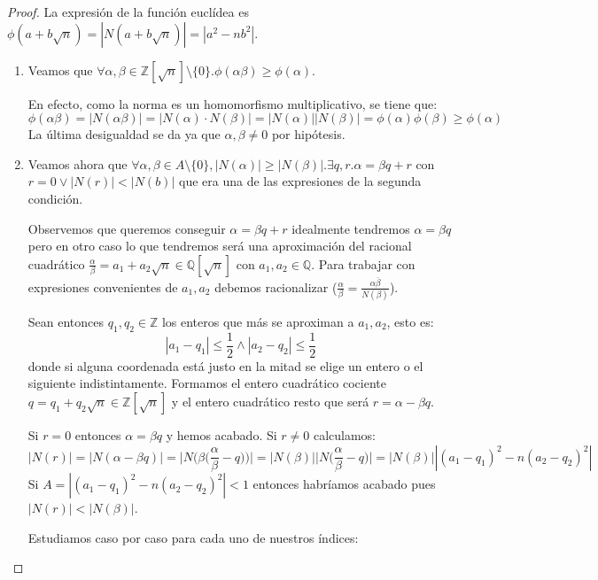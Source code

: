\begin{proof}
	La expresión de la función euclídea es $\phi(a+b\sqrt{n}) = |N(a+b\sqrt{n})| = |a^2 - nb^2|$.
	
	\begin{enumerate}
	\item Veamos que $\forall \alpha,\beta \in \mathbb{Z}[\sqrt{n}] \setminus \{0\}.\phi(\alpha \beta) \ge \phi(\alpha)$. 
	
	En efecto, como la norma es un homomorfismo multiplicativo, se tiene que: $$\phi(\alpha \beta) = |N(\alpha \beta)| = |N(\alpha) \cdot N(\beta)| = |N(\alpha)||N(\beta)| = \phi(\alpha)\phi(\beta) \ge \phi(\alpha)$$ La última desigualdad se da ya que $\alpha,\beta \neq 0$ por hipótesis.
	
	\item Veamos ahora que $\forall \alpha,\beta \in A \setminus \{0\}, |N(\alpha)| \ge |N(\beta )|. \exists q,r. \alpha = \beta q+r$ con $r = 0 \lor |N(r)| < |N(b)|$ que era una de las expresiones de la segunda condición. 
	
	Observemos que queremos conseguir $\alpha = \beta q + r$ idealmente tendremos $\alpha = \beta q$ pero en otro caso lo que tendremos será una aproximación del racional cuadrático $\frac{\alpha}{\beta} = a_1 + a_2 \sqrt{n} \in \mathbb{Q}[\sqrt{n}]$ con $a_1,a_2 \in \mathbb{Q}$. Para trabajar con expresiones convenientes de $a_1,a_2$ debemos racionalizar ($\frac{\alpha}{\beta} = \frac{\alpha \overline{\beta}}{N(\beta)}$).
	
	Sean entonces $q_1,q_2 \in \mathbb{Z}$ los enteros que más se aproximan a $a_1,a_2$, esto es: $$|a_1-q_1| \le \frac{1}{2} \land |a_2 - q_2| \le \frac{1}{2}$$ donde si alguna coordenada está justo en la mitad se elige un entero o el siguiente indistintamente. Formamos el entero cuadrático cociente $q = q_1 + q_2 \sqrt{n} \in \mathbb{Z}[\sqrt{n}]$ y el entero cuadrático resto que será $r = \alpha - \beta q$. 
	
	Si $r = 0$ entonces $\alpha = \beta q$ y hemos acabado. Si $r \neq 0$ calculamos: $$|N(r)| = |N(\alpha - \beta q)| = \Big|N\Big(\beta\Big(\frac{\alpha}{\beta}-q\Big)\Big)\Big| = |N(\beta)|\Big|N\Big(\frac{\alpha}{\beta} - q\Big)\Big| = |N(\beta)||(a_1-q_1)^2-n(a_2-q_2)^2|$$  Si $A = |(a_1-q_1)^2-n(a_2-q_2)^2| < 1$ entonces habríamos acabado pues $|N(r)| < |N(\beta)|$. 
	
	Estudiamos caso por caso para cada uno de nuestros índices:
	

\end{enumerate}
\end{proof}
